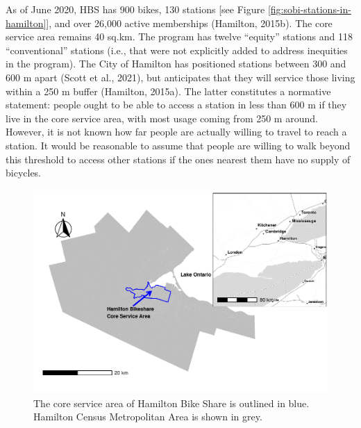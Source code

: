 \documentclass[]{elsarticle} %
\begin{document}
As of June 2020, HBS has 900 bikes, 130 stations {[}see Figure
\ref{fig:sobi-stations-in-hamilton}{]}, and over 26,000 active
memberships (Hamilton, 2015b). The core service area remains 40 sq.km.
The program has twelve ``equity'' stations and 118 ``conventional''
stations (i.e., that were not explicitly added to address inequities in
the program). The City of Hamilton has positioned stations between 300
and 600 m apart (Scott et al., 2021), but anticipates that they will
service those living within a 250 m buffer (Hamilton, 2015a). The latter
constitutes a normative statement: people ought to be able to access a
station in less than 600 m if they live in the core service area, with
most usage coming from 250 m around. However, it is not known how far
people are actually willing to travel to reach a station. It would be
reasonable to assume that people are willing to walk beyond this
threshold to access other stations if the ones nearest them have no
supply of bicycles.

\begin{figure}

{\centering \includegraphics[width=0.9\linewidth]{Bike-share-spatial-equity_files/figure-latex/hamilton-and-sobi-service-area-1} 

}

\caption{The core service area of Hamilton Bike Share is outlined in blue. Hamilton Census Metropolitan Area is shown in grey.}\label{fig:hamilton-and-sobi-service-area}
\end{figure}
\end{document}

